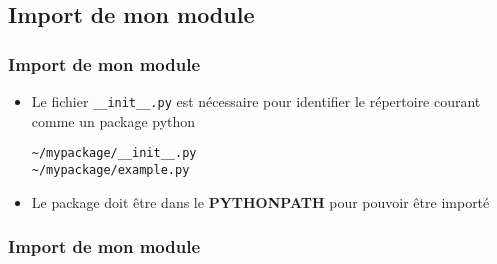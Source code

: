 \subsection{Import de mon module}
\begin{frame}[fragile]
  \frametitle{Import de mon module}
    \begin{itemize}
      \item Le fichier \verb=__init__.py= est nécessaire pour identifier le répertoire courant comme un package python
      \begin{lstlisting}
~/mypackage/__init__.py
~/mypackage/example.py
      \end{lstlisting}
      \pause
      \item Le package doit être dans le {\bf PYTHONPATH} pour pouvoir être importé
    \end{itemize}
\end{frame}

\begin{frame}[fragile]
\frametitle{Import de mon module}
\begin{ipython}
\ipoutp{['', '/usr/bin', '/usr/local/lib/python2.6/dist}
\ipwrapp{-packages', ...]}
\end{ipython}
\end{frame}
\newpage
